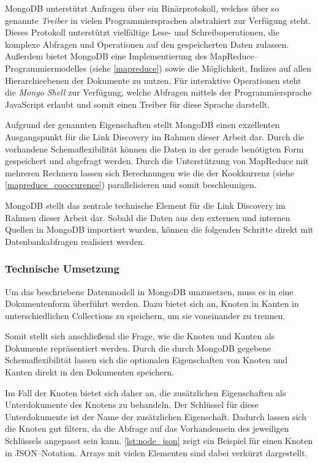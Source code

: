 MongoDB unterstützt Anfragen über ein Binärprotokoll, welches über so genannte \emph{Treiber} in vielen Programmiersprachen abstrahiert zur Verfügung steht. Dieses Protokoll unterstützt vielfältige Lese- und Schreiboperationen, die komplexe Abfragen und Operationen auf den gespeicherten Daten zulassen. Außerdem bietet MongoDB eine Implementierung des MapReduce--Programmiermodelles (siehe \cref{mapreduce}) sowie die Möglichkeit, Indizes auf allen Hierarchieebenen der Dokumente zu nutzen. Für interaktive Operationen steht die \emph{Mongo Shell} zur Verfügung, welche Abfragen mittels der Programmiersprache JavaScript erlaubt und somit einen Treiber für diese Sprache darstellt.

Aufgrund der genannten Eigenschaften stellt MongoDB einen exzellenten Ausgangspunkt für die Link Discovery im Rahmen dieser Arbeit dar. Durch die vorhandene Schemaflexibilität können die Daten in der gerade benötigten Form gespeichert und abgefragt werden. Durch die Unterstützung von MapReduce mit mehreren Rechnern lassen sich Berechnungen wie die der Kookkurrenz (siehe \cref{mapreduce_cooccurence}) parallelisieren und somit beschleunigen.

MongoDB stellt das zentrale technische Element für die Link Discovery im Rahmen dieser Arbeit dar. Sobald die Daten aus den externen und internen Quellen in MongoDB importiert wurden, können die folgenden Schritte direkt mit Datenbankabfragen realisiert werden.

\subsubsection{Technische Umsetzung}

Um das beschriebene Datenmodell in MongoDB umzusetzen, muss es in eine Dokumentenform überführt werden. Dazu bietet sich an, Knoten in Kanten in unterschiedlichen Collections zu speichern, um sie voneinander zu trennen.

Somit stellt sich anschließend die Frage, wie die Knoten und Kanten als Dokumente repräsentiert werden. Durch die durch MongoDB gegebene Schemaflexibilität lassen sich die optionalen Eigenschaften von Knoten und Kanten direkt in den Dokumenten speichern.

Im Fall der Knoten bietet sich daher an, die zusätzlichen Eigenschaften als Unterdokumente des Knotens zu behandeln. Der Schlüssel für diese Unterdokumente ist der Name der zusätzlichen Eigenschaft. Dadurch lassen sich die Knoten gut filtern, da die Abfrage auf das Vorhandensein des jeweiligen Schlüssels angepasst sein kann. \cref{lst:node_json} zeigt ein Beispiel für einen Knoten in JSON--Notation. Arrays mit vielen Elementen sind dabei verkürzt dargestellt.

